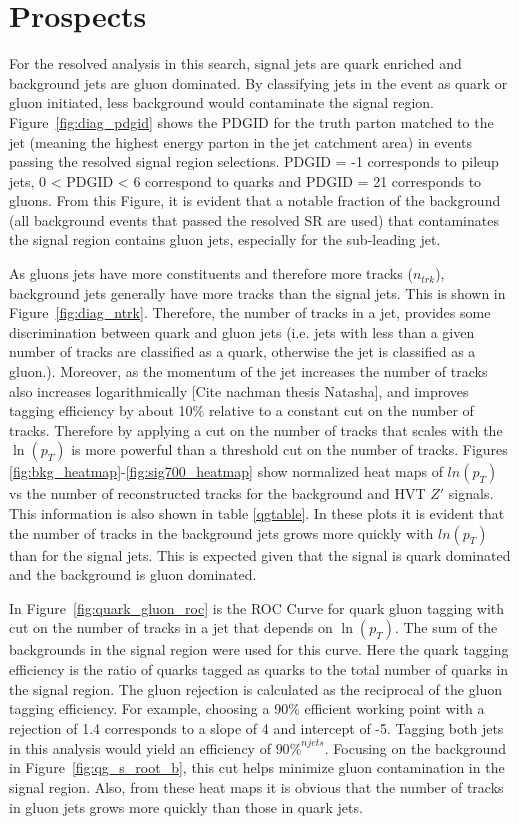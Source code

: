 \label{ch:qg}
\chapter{Prospects}
For the resolved analysis in this search, signal jets are quark enriched and background jets are gluon dominated. By classifying jets in the event as quark or gluon initiated, less background would contaminate the signal region. Figure~\ref{fig:diag_pdgid} shows the PDGID for the truth parton matched to the jet (meaning the highest energy parton in the jet catchment area) in events passing the resolved signal region selections. PDGID = -1 corresponds to pileup jets, 0 < PDGID < 6 correspond to quarks and PDGID = 21 corresponds to gluons. From this Figure, it is evident that a notable fraction of the background (all background events that passed the resolved SR are used) that contaminates the signal region contains gluon jets, especially for the sub-leading jet. 

As gluons jets have more constituents and therefore more tracks ($n_{trk}$), background jets generally have more tracks than the signal jets. This is shown in Figure~\ref{fig:diag_ntrk}. Therefore, the number of tracks in a jet, provides some discrimination between quark and gluon jets (i.e. jets with less than a given number of tracks are classified as a quark, otherwise the jet is classified as a gluon.). Moreover, as the momentum of the jet increases the number of tracks also increases logarithmically [Cite nachman thesis Natasha], and improves tagging efficiency by about 10\% relative to a constant cut on the number of tracks. Therefore by applying a cut on the number of tracks that scales with the $\ln(p_{T})$ is more powerful than a threshold cut on the number of tracks. Figures \ref{fig:bkg_heatmap}-\ref{fig:sig700_heatmap} show normalized heat maps of $ln(p_{T})$ vs the number of reconstructed tracks for the background and HVT $Z'$ signals. This information is also shown in table \ref{qgtable}. In these plots it is evident that the number of tracks in the background jets grows more quickly with $ln(p_{T})$ than for the signal jets. This is expected given that the signal is quark dominated and the background is gluon dominated. 

In Figure~\ref{fig:quark_gluon_roc} is the ROC Curve for quark gluon tagging with cut on the number of tracks in a jet that depends on $\ln(p_{T})$. The sum of the backgrounds in the signal region were used for this curve. Here the quark tagging efficiency is the ratio of quarks tagged as quarks to the total number of quarks in the signal region. The gluon rejection is calculated as the reciprocal of the gluon tagging efficiency. For example, choosing a 90\% efficient working point with a rejection of 1.4 corresponds to a slope of 4 and intercept of -5. Tagging both jets in this analysis would yield an efficiency of $90\%^{njets}$. Focusing on the background in Figure~\ref{fig:qg_s_root_b}, this cut helps minimize gluon contamination in the signal region. Also, from these heat maps it is obvious that the number of tracks in gluon jets grows more quickly than those in quark jets.
\pagebreak

